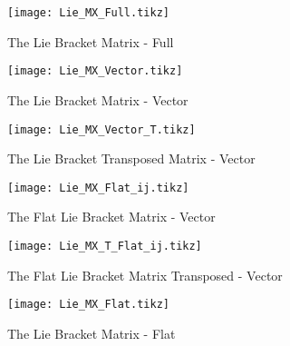 \documentclass[11 pt]{article}
\begin{document}
	\begin{figure}
        \centering
            \texttt{[image: Lie\_MX\_Full.tikz]} %
            \label{fig:pic} %
            \caption{\footnotesize The Lie Bracket Matrix - Full} %
    \end{figure}
    
    \begin{figure}
        \centering
            \texttt{[image: Lie\_MX\_Vector.tikz]} %
            \label{fig:pic} %
                \caption{\footnotesize The Lie Bracket Matrix - Vector} %
    \end{figure}
    
    \begin{figure}
        \centering
            \texttt{[image: Lie\_MX\_Vector\_T.tikz]} %
            \label{fig:pic} %
                \caption{\footnotesize The Lie Bracket Transposed Matrix - Vector} %
    \end{figure}
    
    \begin{figure}
        \centering
            \texttt{[image: Lie\_MX\_Flat\_ij.tikz]} %
            \label{fig:pic} %
                \caption{\footnotesize The Flat Lie Bracket Matrix - Vector} %
    \end{figure}
    
        \begin{figure}
        \centering
            \texttt{[image: Lie\_MX\_T\_Flat\_ij.tikz]} %
            \label{fig:pic} %
                \caption{\footnotesize The Flat Lie Bracket Matrix Transposed - Vector} %
    \end{figure}
    
    \begin{figure}
        \centering
            \texttt{[image: Lie\_MX\_Flat.tikz]} %
            \label{fig:pic} %
                \caption{\footnotesize The Lie Bracket Matrix - Flat} %
    \end{figure}   
    
\end{document}
